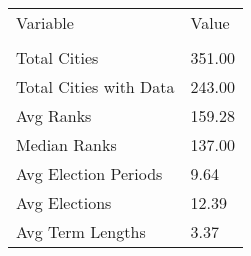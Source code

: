 \begin{tabular}{l|l}
\toprule
               Variable &         Value \\
                        &               \\
\midrule
           Total Cities &        351.00 \\
 Total Cities with Data &        243.00 \\
              Avg Ranks &        159.28 \\
           Median Ranks &        137.00 \\
   Avg Election Periods &          9.64 \\
          Avg Elections &         12.39 \\
       Avg Term Lengths &          3.37 \\
\bottomrule
\end{tabular}
